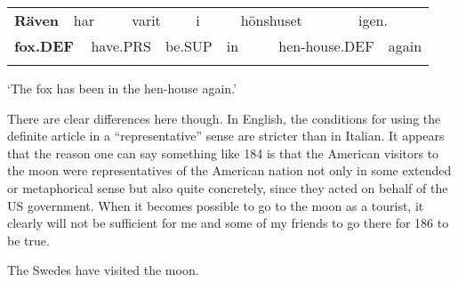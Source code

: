 \begin{tabular}{llllllllllll}
\lsptoprule
{\bfseries Räven} & \multicolumn{2}{l}{har

} & \multicolumn{2}{l}{varit

} & \multicolumn{2}{l}{i

} & \multicolumn{2}{l}{hönshuset

} & \multicolumn{2}{l}{igen.

} & \\
\multicolumn{2}{l}{{\bfseries fox.DEF}

} & \multicolumn{2}{l}{have.PRS

} & \multicolumn{2}{l}{be.SUP

} & \multicolumn{2}{l}{in

} & \multicolumn{2}{l}{hen-house.DEF

} & \multicolumn{2}{l}{again

}\\
\lspbottomrule
\end{tabular}

\begin{styleTranslation}
‘The fox has been in the hen-house again.’

\end{styleTranslation}

\begin{styleBodyTextFirst}
There are clear differences here though. In English, the conditions for using the definite article in a “representative” sense are stricter than in Italian. It appears that the reason one can say something like 184 is that the American visitors to the moon were representatives of the American nation not only in some extended or metaphorical sense but also quite concretely, since they acted on behalf of the US government. When it becomes possible to go to the moon as a tourist, it clearly will not be sufficient for me and some of my friends to go there for 186 to be true.

\end{styleBodyTextFirst}

\begin{listWWNumileveli}
\item 

\begin{styleExample}
\label{bkm:Ref94431191}The Swedes have visited the moon.

\end{styleExample}

\end{listWWNumileveli}

